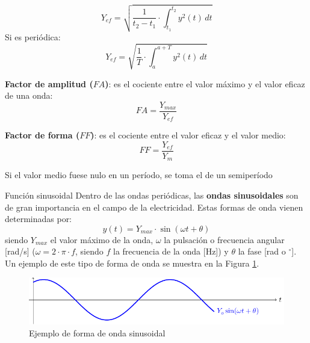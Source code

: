 \documentclass[11pt]{book} %
\makeatletter
\numberwithin{dummy}{section}
\theoremstyle{ocrenumbox}
\theoremstyle{blacknumex}
\theoremstyle{blacknumbox}
\theoremstyle{ocrenum}
\newenvironment{remark}{\par\vspace{10pt}\small %
\begin{list}{}{
\leftmargin=35pt %
\rightmargin=25pt}\item\ignorespaces %
\makebox[-2.5pt]{\begin{tikzpicture}[overlay]
\node[draw=ocre!60,line width=1pt,circle,fill=ocre!25,font=\sffamily\bfseries,inner sep=2pt,outer sep=0pt] at (-15pt,0pt){\textcolor{ocre}{N}};\end{tikzpicture}} %
\advance\baselineskip -1pt}{\end{list}\vskip5pt} %
\renewcommand{\subsubsection}{\@startsection {subsubsection}{3}{\z@}
{-2ex \@plus -0.1ex \@minus -.2ex}
{.2ex \@plus.2ex }
{\normalfont\small\sffamily\bfseries}}
\newlength\esp
\makeatother
\begin{document}
\begin{itemize}
		\begin{equation*}
			Y_{ef}=\sqrt{\dfrac{1}{t_2-t_1}\cdot\int_{t_1}^{t_2}y^2(t)\, dt}
		\end{equation*}
		Si es periódica: 
		\begin{equation}
			\boxed{Y_{ef} = \sqrt{\frac{1}{T}\cdot\int_{a}^{a+T}y^{2}(t)\, dt}}
		\end{equation}
		\item \textbf{Factor de amplitud ($FA$)}: es el cociente entre el valor máximo y el valor eficaz de una onda:
		\begin{equation*}
			FA = \dfrac{Y_{max}}{Y_{ef}}
		\end{equation*}
		\item \textbf{Factor de forma ($FF$)}: es el cociente entre el valor eficaz y el valor medio:
		\begin{equation*}
			FF = \dfrac{Y_{ef}}{Y_{m}}
		\end{equation*}
		\begin{remark}
			Si el valor medio fuese nulo en un período, se toma el de un semiperíodo
		\end{remark}
	\end{itemize}
	
	\subsubsection{Función sinusoidal}\label{sec.sinusoidal}
	Dentro de las ondas periódicas, las \textbf{ondas sinusoidales} son de gran importancia en el campo de la electricidad. Estas formas de onda vienen determinadas por:
	\begin{equation}
		\boxed{y(t)=Y_{max}\cdot\sin(\omega t+\theta)} 
	\end{equation}
	siendo $Y_{max}$ el valor máximo de la onda, $\omega$ la pulsación o frecuencia angular [rad/s] ($\omega=2\cdot\pi\cdot f$, siendo $f$ la frecuencia de la onda [Hz]) y $\theta$ la fase [rad o $^\circ$]. Un ejemplo de este tipo de forma de onda se muestra en la Figura \ref{fig.sin}.
	\begin{figure}[htbp]
		\centering
		\includegraphics[width=.9\linewidth]{../figs/sin.pdf}
		\caption{Ejemplo de forma de onda sinusoidal}
		\label{fig.sin}
	\end{figure}
	
\end{document}

